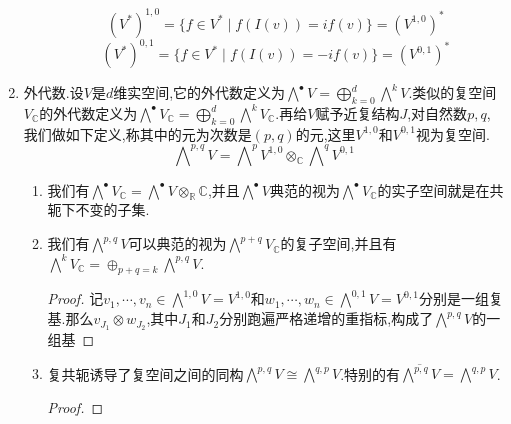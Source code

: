 \begin{enumerate}
\begin{enumerate}[(1)]
    	$$(V^*)^{1,0}=\{f\in V^*\mid f(I(v))=if(v)\}=(V^{1,0})^*$$
    	$$(V^*)^{0,1}=\{f\in V^*\mid f(I(v))=-if(v)\}=(V^{0,1})^*$$
    \end{enumerate}
    \item 外代数.设$V$是$d$维实空间,它的外代数定义为$\bigwedge^{\bullet}V=\bigoplus_{k=0}^d\bigwedge^kV$.类似的复空间$V_{\mathbb{C}}$的外代数定义为$\bigwedge^{\bullet}V_{\mathbb{C}}=\bigoplus_{k=0}^d\bigwedge^kV_{\mathbb{C}}$.再给$V$赋予近复结构$J$,对自然数$p,q$,我们做如下定义,称其中的元为次数是$(p,q)$的元,这里$V^{1,0}$和$V^{0,1}$视为复空间.
    $$\bigwedge\nolimits^{p,q}V=\bigwedge\nolimits^pV^{1,0}\otimes_{\mathbb{C}}\bigwedge\nolimits^qV^{0,1}$$
    \begin{enumerate}[(1)]
    	\item 我们有$\bigwedge^{\bullet}V_{\mathbb{C}}=\bigwedge^{\bullet}V\otimes_{\mathbb{R}}\mathbb{C}$,并且$\bigwedge^{\bullet}V$典范的视为$\bigwedge^{\bullet}V_{\mathbb{C}}$的实子空间就是在共轭下不变的子集.
    	\item 我们有$\bigwedge^{p,q}V$可以典范的视为$\bigwedge^{p+q}V_{\mathbb{C}}$的复子空间,并且有$\bigwedge^kV_{\mathbb{C}}=\oplus_{p+q=k}\bigwedge^{p,q}V$.
    	\begin{proof}
    		
    		记$v_1,\cdots,v_n\in\bigwedge^{1,0}V=V^{1,0}$和$w_1,\cdots,w_n\in\bigwedge^{0,1}V=V^{0,1}$分别是一组复基.那么$v_{J_1}\otimes w_{J_2}$,其中$J_1$和$J_2$分别跑遍严格递增的重指标,构成了$\bigwedge^{p,q}V$的一组基
    	\end{proof}
        \item 复共轭诱导了复空间之间的同构$\bigwedge^{p,q}V\cong\bigwedge^{q,p}V$.特别的有$\overline{\bigwedge^{p,q}V}=\bigwedge^{q,p}V$.
        \begin{proof}
        	

\end{proof}
\end{enumerate}
\end{enumerate}
